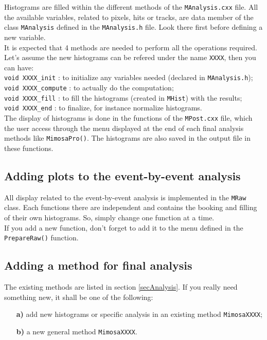 \documentclass[a4paper, 12pt, twoside]{article}
\begin{document}
\noindent
Histograms are filled within the different methods of the {\tt MAnalysis.cxx} file. All the available variables, related to pixels, hits or tracks, are data member of the class {\tt MAnalysis} defined in the {\tt MAnalysis.h} file. Look there first before defining a new variable.\\
It is expected that 4 methods are needed to perform all the operations required. Let's assume the new histograms can be refered under the name {\tt XXXX}, then you can have:\\
\hspace*{.5 cm} {\tt void XXXX\_init} : to initialize any variables needed (declared in {\tt MAnalysis.h});\\
\hspace*{.5 cm} {\tt void XXXX\_compute} : to actually do the computation;\\
\hspace*{.5 cm} {\tt void XXXX\_fill} : to fill the histograms (created in {\tt MHist}) with the results;\\
\hspace*{.5 cm} {\tt void XXXX\_end} : to finalize, for instance normalize histograms.\\


\noindent
The display of histograms is done in the functions of the {\tt MPost.cxx} file, which the user access through the menu displayed at the end of each final analysis methods like {\tt MimosaPro()}. The histograms are also saved in the output file in these functions.


\subsection{Adding plots to the event-by-event analysis}

All display related to the event-by-event analysis is implemented in the {\tt MRaw} class. Each functions there are independent and contains the booking and filling of their own histograms. So, simply change one function at a time.\\
If you add a new function, don't forget to add it to the menu defined in the {\tt PrepareRaw()} function.



\subsection{Adding a method for final analysis}

The existing methods are listed in section \ref{secAnalysis}. If you really need something new, it shall be one of the following:
\begin{itemize}
\item[{\bf a)}] add new histograms or specific analysis in an existing method {\tt MimosaXXXX};
\item[{\bf b)}] a new general method {\tt MimosaXXXX}.
\end{itemize}
\end{document}

